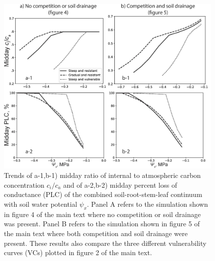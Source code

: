 \documentclass[utf8]{frontiers_suppmat} %
\begin{document}
\begin{figure}[b]
    \centering
    \includegraphics[scale=0.75]{PLC_cica.jpg}
    \caption{Trends of a-1,b-1) midday ratio of internal to atmospheric carbon concentration $c_i / c_a$ and of a-2,b-2) midday percent loss of conductance (PLC) of the combined soil-root-stem-leaf continuum with soil water potential $\psi_x$. Panel A refers to the simulation shown in figure 4 of the main text where no competition or soil drainage was present. Panel B refers to the simulation shown in figure 5 of the main text where both competition and soil drainage were present. These results also compare the three different vulnerability curves (VCs) plotted in figure 2 of the main text.}
    \label{fig:PLC_cica}
\end{figure}

\end{document}
